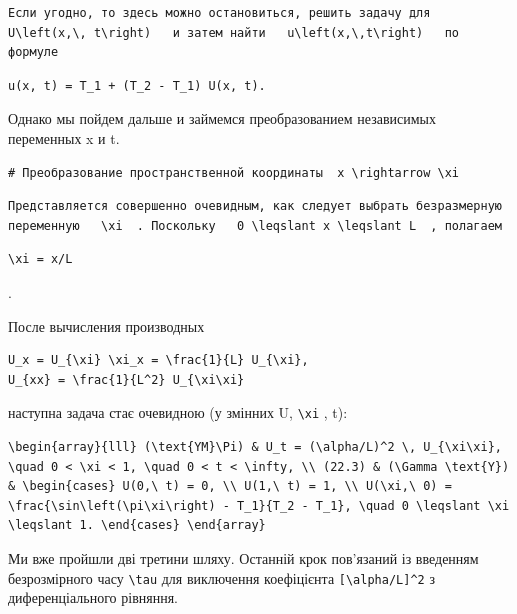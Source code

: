 \documentclass[
  ukrainian,
]{article}
\begin{document}
\begin{verbatim}
Если угодно, то здесь можно остановиться, решить задачу для   U\left(x,\, t\right)   и затем найти   u\left(x,\,t\right)   по формуле
\end{verbatim}

\begin{verbatim}
u(x, t) = T_1 + (T_2 - T_1) U(x, t).
\end{verbatim}

Однако мы пойдем дальше и займемся преобразованием независимых
переменных x и t.

\begin{verbatim}
# Преобразование пространственной координаты  x \rightarrow \xi
\end{verbatim}

\begin{verbatim}
Представляется совершенно очевидным, как следует выбрать безразмерную переменную   \xi  . Поскольку   0 \leqslant x \leqslant L  , полагаем
\end{verbatim}

\begin{verbatim}
\xi = x/L
\end{verbatim}

.

После вычисления производных

\begin{verbatim}
U_x = U_{\xi} \xi_x = \frac{1}{L} U_{\xi},
U_{xx} = \frac{1}{L^2} U_{\xi\xi}
\end{verbatim}

наступна задача стає очевидною (у змінних U, \texttt{\textbackslash{}xi}
, t):

\begin{verbatim}
\begin{array}{lll} (\text{YM}\Pi) & U_t = (\alpha/L)^2 \, U_{\xi\xi}, \quad 0 < \xi < 1, \quad 0 < t < \infty, \\ (22.3) & (\Gamma \text{Y}) & \begin{cases} U(0,\ t) = 0, \\ U(1,\ t) = 1, \\ U(\xi,\ 0) = \frac{\sin\left(\pi\xi\right) - T_1}{T_2 - T_1}, \quad 0 \leqslant \xi \leqslant 1. \end{cases} \end{array}
\end{verbatim}

Ми вже пройшли дві третини шляху. Останній крок пов'язаний із введенням
безрозмірного часу \texttt{\textbackslash{}tau} для виключення
коефіцієнта \texttt{{[}\textbackslash{}alpha/L{]}\^{}2} з
диференціального рівняння.
\end{document}

